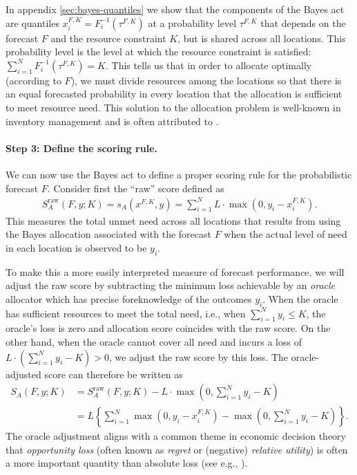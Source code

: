\documentclass{article}\usepackage[]{graphicx}\usepackage[]{xcolor}
\begin{document}
In appendix \ref{sec:bayes-quantiles} we show that the components of the Bayes act are quantiles 
$x_i^{F,K} = F_i^{-1}(\tau^{F,K})$ at a probability level $\tau^{F,K}$ that depends on the forecast $F$ and the resource
constraint $K$, but is shared across all locations. This probability level is the level at which the resource constraint
is satisfied: $\sum_{i=1}^N F_i^{-1}(\tau^{F,K}) = K$. This tells us that in order to allocate optimally (according to
$F$), we must divide resources among the locations so that there is an equal forecasted probability in every location
that the allocation is sufficient to meet resource need. This solution to the allocation problem is well-known in
inventory management and is often attributed to \cite{hadleywhitin1963}.

\paragraph{Step 3: Define the scoring rule.} We can now use the Bayes act to define a proper scoring rule for the
probabilistic forecast $F$. Consider first the ``raw'' score defined as
\begin{align}
  S_A^{\text{raw}}(F, y; K) = s_A(x^{F,K}, y) = \sum_{i=1}^N L \cdot \max(0, y_i - x_i^{F,K}).
\end{align}
This measures the total unmet need across all locations that results from using the Bayes allocation associated with the
forecast $F$ when the actual level of need in each location is observed to be $y_i$.

To make this a more easily interpreted measure of forecast performance, we will adjust the raw score by subtracting the
minimum loss achievable by an \emph{oracle} allocator which has precise foreknowledge of the outcomes $y_i$. When the
oracle has sufficient resources to meet the total need, i.e., when $\sum_{i=1}^{N}y_i \leq K$, the oracle's loss is zero
and allocation score coincides with the raw score. On the other hand, when the oracle cannot cover all need and incurs a
loss of $L \cdot \left(\sum_{i=1}^{N}y_i - K \right) > 0$, we adjust the raw score by this loss.
The oracle-adjusted score can therefore be written as
\begin{align}
  S_A(F, y; K)  &= S_A^{\text{raw}}(F, y; K) - L \cdot \max\left(0,\sum_{i=1}^{N}y_i - K\right) \\
  &= L\left\{\sum_{i=1}^N \max(0, y_i - x_i^{F,K}) -  \max\left(0,\sum_{i=1}^{N}y_i - K\right)\right\}.
\end{align}
The oracle adjustment aligns with a common theme in economic decision theory that \emph{opportunity loss} (often known
as \emph{regret} or (negative) \emph{relative utility}) is often a more important quantity than absolute loss (see e.g.,
\cite{DIECIDUE201788}).
\end{document}

